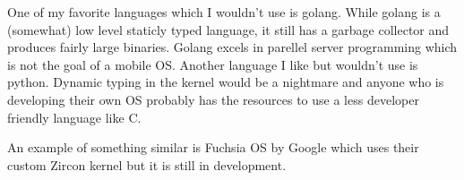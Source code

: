 \documentclass{article}
\begin{document}
One of my favorite languages which I wouldn't use is golang. While golang is a (somewhat) low level staticly typed language, it still has a garbage collector and produces fairly large binaries. Golang excels in parellel server programming which is not the goal of a mobile OS. Another language I like but wouldn't use is python. Dynamic typing in the kernel would be a nightmare and anyone who is developing their own OS probably has the resources to use a less developer friendly language like C.

An example of something similar is Fuchsia OS by Google which uses their custom Zircon kernel but it is still in development.
\end{document}
